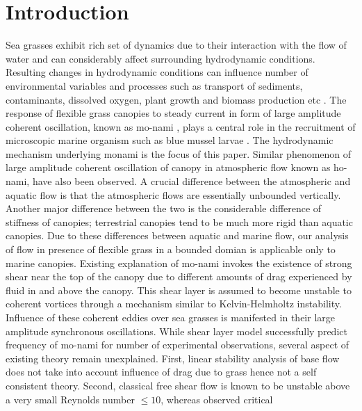 \documentclass[aps,prl,twocolumn,showpacs,superscriptaddress,groupedaddress,10pt]{revtex4-1}  %
\begin{document}
\section{Introduction}
Sea grasses exhibit rich set of dynamics due to their interaction with the flow of water and can considerably affect surrounding hydrodynamic conditions.
Resulting changes in hydrodynamic conditions can influence number of environmental variables and processes such as 
transport of sediments, contaminants, dissolved oxygen, plant growth and biomass production etc \cite{Fonseca87,Nepf99}. 
The response of flexible grass canopies to steady current in form of large amplitude coherent oscillation, known as mo-nami \cite{AckermanOkubo93}, plays a central role
in the recruitment of microscopic marine organism such as blue mussel larvae \cite{Grizzle96}. The hydrodynamic mechanism underlying monami is the focus of this paper. 
\newline
Similar phenomenon of large amplitude coherent oscillation of canopy in atmospheric flow known as ho-nami\cite{Inoue56,Raupach96}, have also been observed.
A crucial difference between the atmospheric and aquatic flow is that the atmospheric flows are essentially unbounded vertically. Another major
difference between the two is the considerable difference of stiffness of canopies; terrestrial canopies tend to be much more rigid than aquatic canopies.
Due to these differences between aquatic and marine flow, our analysis of flow in presence of flexible grass in a bounded domian is applicable only to marine canopies. 
\newline   
Existing explanation of mo-nami invokes the existence of strong shear near the top of the canopy \cite{Ghisal02,Raupach96} due to
different amounts of drag experienced by fluid in and above the canopy. This shear layer is assumed to become unstable to coherent vortices through a mechanism similar to 
Kelvin-Helmholtz instability. Influence of these coherent eddies over sea grasses is manifested in their large amplitude synchronous oscillations.
\newline
While shear layer model successfully predict frequency of mo-nami for number of experimental observations,
several aspect of existing theory remain unexplained. First, linear stability analysis of base flow does not take into account influence of drag due to grass hence not a self 
consistent theory. Second, classical free shear flow is known to be unstable above a very small Reynolds number $\leq 10 $, whereas observed critical 
\end{document}
